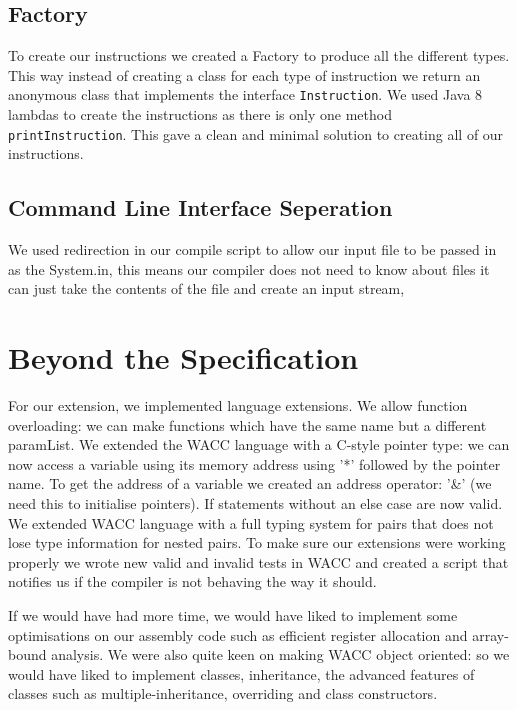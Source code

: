 \documentclass[11pt,a4paper]{article}
\begin{document}
\subsection{Factory}
\label{sub:Factory}
To create our instructions we created a Factory to produce all the different types. This way instead of creating a class for each type of instruction we return an anonymous class that implements the interface \texttt{Instruction}. We used Java 8 lambdas to create the instructions as there is only one method \texttt{printInstruction}. This gave a clean and minimal solution to creating all of our instructions.

\subsection{Command Line Interface Seperation}
\label{sub:Command Line Interface Seperation}
We used redirection in our compile script to allow our input file to be passed in as the System.in, this means our compiler does not need to know about files it can just take the contents of the file and create an input stream,

\section{Beyond the Specification}
\label{sec:Beyond the Specification}
For our extension, we implemented language extensions. We allow function overloading: we can make functions which have the same name but a different paramList. We extended the WACC language with a C-style pointer type: we can now access a variable using its memory address using '*' followed by the pointer name. To get the address of a variable we created an address operator: '&' (we need this to initialise pointers). If statements without an else case are now valid. We extended WACC language with a full typing system for pairs that does not lose type information for nested pairs.
To make sure our extensions were working properly we wrote new valid and invalid tests in WACC and created a script that notifies us if the compiler is not behaving the way it should.

If we would have had more time, we would have liked to implement some optimisations on our assembly code such as efficient register allocation and array-bound analysis. We were also quite keen on making WACC object oriented: so we would have liked to implement classes, inheritance, the advanced features of classes such as multiple-inheritance, overriding and class constructors.
\end{document}
